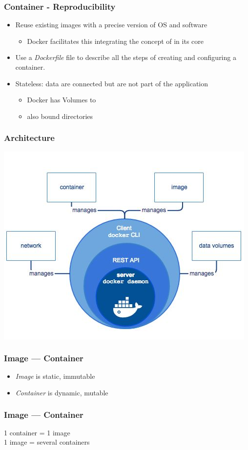 \begin{frame}
\frametitle{Container - Reproducibility}
\begin{itemize}
\item  Reuse existing images with a precise version of OS and software
\begin{itemize}
   \item   Docker facilitates this integrating the concept of  in its core
\end{itemize}
\item  Use a \textit{Dockerfile} file to describe all the steps of creating and configuring a container.
\item  Stateless: data are connected but are not part of the application
\begin{itemize}
  \item   Docker has Volumes to 
  \item   also bound directories
\end{itemize}
\end{itemize}
\end{frame}

\begin{frame}
\frametitle{Architecture}
\begin{center}
  \includegraphics[width=\columnwidth]{./Figure/docker-048-041}
\end{center}
\end{frame}

\begin{frame}
\frametitle{Image --- Container}

\begin{itemize}
\item \textit{Image} is static, immutable
\item \textit{Container} is dynamic, mutable
\end{itemize}
\end{frame}

\begin{frame}
\frametitle{Image --- Container}

\begin{center}
1 container = 1 image\\
\vspace{0.5cm}
1 image = several containers
\end{center}
\end{frame}